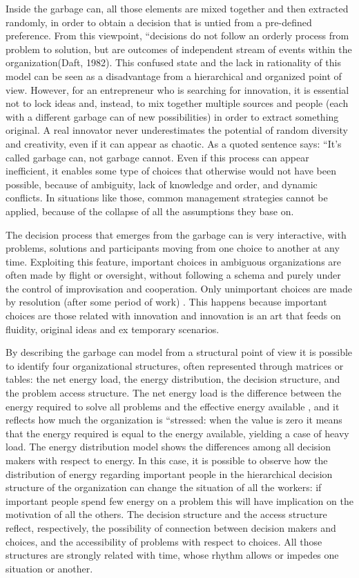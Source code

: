Inside the garbage can, all those elements are mixed together and then extracted randomly, in order to obtain a decision that is untied from a pre-defined preference. From this viewpoint, ``decisions do not follow an orderly process from problem to solution, but are outcomes of independent stream of events within the organization(Daft, 1982)\cite{3}. This confused state and the lack in rationality of this model can be seen as a disadvantage from a hierarchical and organized point of view. However, for an entrepreneur who is searching for innovation, it is essential not to lock ideas and, instead, to mix together multiple sources and people (each with a different garbage can of new possibilities) in order to extract something original. A real innovator never underestimates the potential of random diversity and creativity, even if it can appear as chaotic. As a quoted sentence says: ``It’s called garbage can, not garbage cannot. Even if this process can appear inefficient, it enables some type of choices that otherwise would not have been possible, because of ambiguity, lack of knowledge and order, and dynamic conflicts. In situations like those, common management strategies cannot be applied, because of the collapse of all the assumptions they base on.

The decision process that emerges from the garbage can is very interactive, with problems, solutions and participants moving from one choice to another at any time. Exploiting this feature, important choices in ambiguous organizations are often made by flight or oversight, without following a schema and purely under the control of improvisation and cooperation. Only unimportant choices are made by resolution (after some period of work) \cite{1}. This happens because important choices are those related with innovation and innovation is an art that feeds on fluidity, original ideas and ex temporary scenarios.

By describing the garbage can model from a structural point of view it is possible to identify four organizational structures, often represented through matrices or tables: the net energy load, the energy distribution, the decision structure, and the problem access structure. The net energy load is the difference between the energy required to solve all problems and the effective energy available \cite{1}, and it reflects how much the organization is ``stressed: when the value is zero it means that the energy required is equal to the energy available, yielding a case of heavy load. The energy distribution model shows the differences among all decision makers with respect to energy. In this case, it is possible to observe how the distribution of energy regarding important people in the hierarchical decision structure of the organization can change the situation of all the workers: if important people spend few energy on a problem this will have implication on the motivation of all the others. The decision structure and the access structure reflect, respectively, the possibility of connection between decision makers and choices, and the accessibility of problems with respect to choices. All those structures are strongly related with time, whose rhythm allows or impedes one situation or another.

